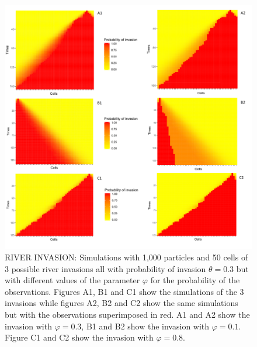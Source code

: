 \begin{figure}
    \includegraphics[width=\textwidth]{river_007.png}
    \caption{RIVER INVASION: Simulations with 1,000 particles and 50 cells of 3 possible river invasions all with probability of invasion $\theta = 0.3$ but with different values of the parameter $\varphi$ for the probability of the observations. Figures A1, B1 and C1 show the simulations of the 3 invasions while figures A2, B2 and C2 show the same simulations but with the observations superimposed in red. A1 and A2 show the invasion with $\varphi = 0.3$, B1 and B2 show the invasion with $\varphi = 0.1$. Figure C1 and C2 show the invasion with $\varphi = 0.8$.}
    \label{fig:2}
\end{figure}





